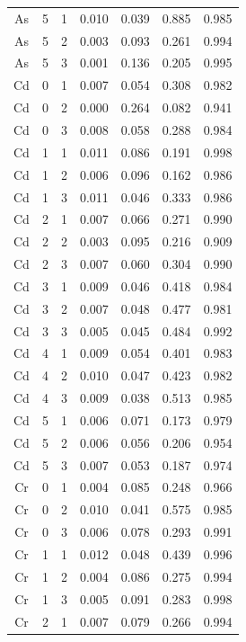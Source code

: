 \documentclass[ms, hidelinks]{uncgdissertationexp3}
\theoremstyle{plain}
\theoremstyle{definition}
\theoremstyle{remark}
\begin{document}
\begin{longtable}{ccccccc}
  As & 5 & 1 & 0.010 & 0.039 & 0.885 & 0.985\\
  \rowcolor{gray!6}  As & 5 & 2 & 0.003 & 0.093 & 0.261 & 0.994\\
  As & 5 & 3 & 0.001 & 0.136 & 0.205 & 0.995\\
  \rowcolor{gray!6}  Cd & 0 & 1 & 0.007 & 0.054 & 0.308 & 0.982\\
  Cd & 0 & 2 & 0.000 & 0.264 & 0.082 & 0.941\\
  \rowcolor{gray!6}  Cd & 0 & 3 & 0.008 & 0.058 & 0.288 & 0.984\\
  Cd & 1 & 1 & 0.011 & 0.086 & 0.191 & 0.998\\
  \rowcolor{gray!6}  Cd & 1 & 2 & 0.006 & 0.096 & 0.162 & 0.986\\
  Cd & 1 & 3 & 0.011 & 0.046 & 0.333 & 0.986\\
  \rowcolor{gray!6}  Cd & 2 & 1 & 0.007 & 0.066 & 0.271 & 0.990\\
  Cd & 2 & 2 & 0.003 & 0.095 & 0.216 & 0.909\\
  \rowcolor{gray!6}  Cd & 2 & 3 & 0.007 & 0.060 & 0.304 & 0.990\\
  Cd & 3 & 1 & 0.009 & 0.046 & 0.418 & 0.984\\
  \rowcolor{gray!6}  Cd & 3 & 2 & 0.007 & 0.048 & 0.477 & 0.981\\
  Cd & 3 & 3 & 0.005 & 0.045 & 0.484 & 0.992\\
  \rowcolor{gray!6}  Cd & 4 & 1 & 0.009 & 0.054 & 0.401 & 0.983\\
  Cd & 4 & 2 & 0.010 & 0.047 & 0.423 & 0.982\\
  \rowcolor{gray!6}  Cd & 4 & 3 & 0.009 & 0.038 & 0.513 & 0.985\\
  Cd & 5 & 1 & 0.006 & 0.071 & 0.173 & 0.979\\
  \rowcolor{gray!6}  Cd & 5 & 2 & 0.006 & 0.056 & 0.206 & 0.954\\
  Cd & 5 & 3 & 0.007 & 0.053 & 0.187 & 0.974\\
  \rowcolor{gray!6}  Cr & 0 & 1 & 0.004 & 0.085 & 0.248 & 0.966\\
  Cr & 0 & 2 & 0.010 & 0.041 & 0.575 & 0.985\\
  \rowcolor{gray!6}  Cr & 0 & 3 & 0.006 & 0.078 & 0.293 & 0.991\\
  Cr & 1 & 1 & 0.012 & 0.048 & 0.439 & 0.996\\
  \rowcolor{gray!6}  Cr & 1 & 2 & 0.004 & 0.086 & 0.275 & 0.994\\
  Cr & 1 & 3 & 0.005 & 0.091 & 0.283 & 0.998\\
  \rowcolor{gray!6}  Cr & 2 & 1 & 0.007 & 0.079 & 0.266 & 0.994\\

\end{longtable}
\end{document}
